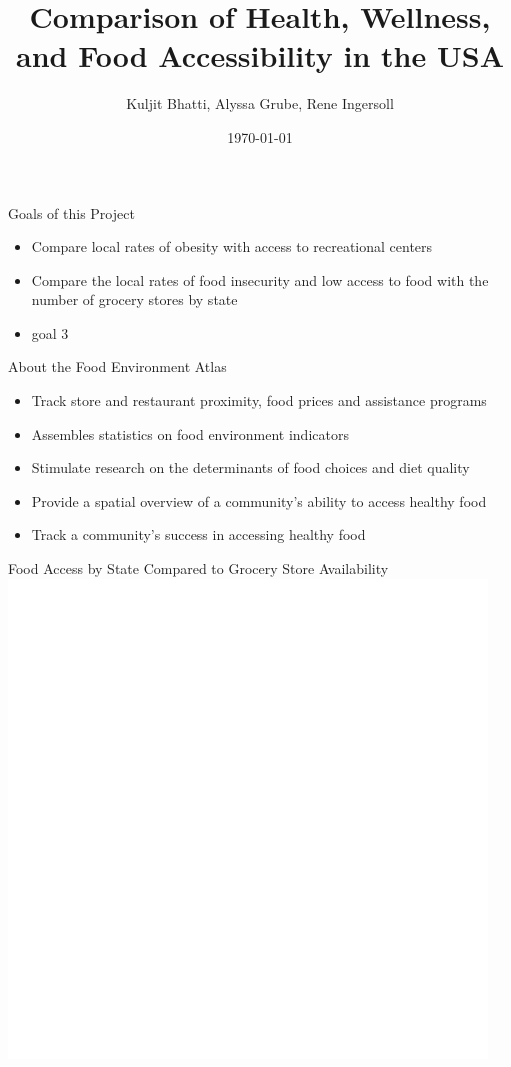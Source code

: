 \documentclass{beamer} %
\title[Comparison of Health, Wellness, and Food Accessibility in the USA ]{Comparison of Health, Wellness, and Food Accessibility in the USA }
\institute[UNL]{University of Nebraska-Lincoln}
\author{Kuljit Bhatti, Alyssa Grube, Rene Ingersoll}
\date{\today}
\begin{document}

	
	\begin{frame}
		\titlepage
	\end{frame}
	
	
	
	\begin{frame}{Goals of this Project}
		\begin{itemize}
			\item Compare local rates of obesity with access to recreational centers  
			\item Compare the local rates of food insecurity and low access to food with the number of grocery stores by state  
			\item goal 3 
		\end{itemize}
	\end{frame}
	
	
	\begin{frame}{About the Food Environment Atlas} 
		\begin{itemize}
			\item Track store and restaurant proximity, food prices and assistance programs 
			\item Assembles statistics on food environment indicators 
			\item Stimulate research on the determinants of food choices and diet quality 
			\item Provide a spatial overview of a community's ability to access healthy food 
			\item Track a community's success in accessing healthy food 
		\end{itemize}
	\end{frame}

\begin{frame}{Food Access by State Compared to Grocery Store Availability}
	\includegraphics{grocplot.jpg} 

	\end{frame}
	
\end{document}
